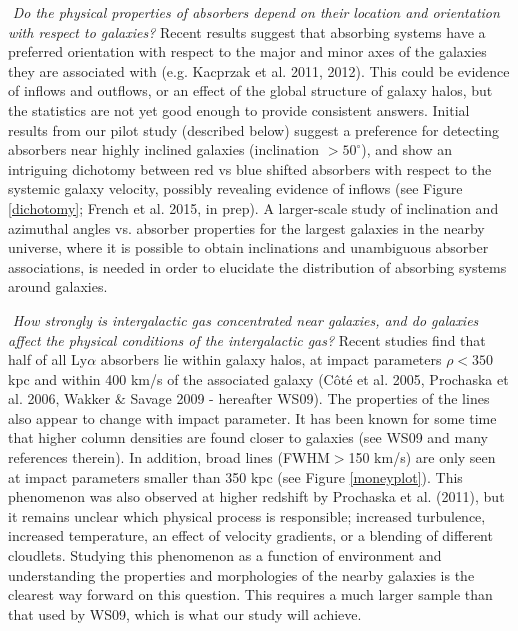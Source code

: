 \documentclass[iop]{emulateapj-rtx4}
\begin{document}
\indent \textbullet $ $ \textit{Do the physical properties of absorbers depend on their location and orientation with respect to galaxies?} Recent results suggest that absorbing systems have a preferred orientation with respect to the major and minor axes of the galaxies they are associated with (e.g. Kacprzak et al. 2011, 2012). This could be evidence of inflows and outflows, or an effect of the global structure of galaxy halos, but the statistics are not yet good enough to provide consistent answers. Initial results from our pilot study (described below) suggest a preference for detecting absorbers near highly inclined galaxies (inclination $>50^{\circ}$), and show an intriguing dichotomy between red vs blue shifted absorbers with respect to the systemic galaxy velocity, possibly revealing evidence of inflows (see Figure \ref{dichotomy}; French et al. 2015, in prep). A larger-scale study of inclination and azimuthal angles vs. absorber properties for the largest galaxies in the nearby universe, where it is possible to obtain inclinations and unambiguous absorber associations, is needed in order to elucidate the distribution of absorbing systems around galaxies.

\vspace{10pt}
\indent \textbullet $ $ \textit{How strongly is intergalactic gas concentrated near galaxies, and do galaxies affect the physical conditions of the intergalactic gas?} Recent studies find that half of all Ly$\alpha$ absorbers lie within galaxy halos, at impact parameters $\rho<350$kpc and within 400 km/s of the associated galaxy (C\^{o}t\'{e} et al. 2005, Prochaska et al. 2006, Wakker $\&$ Savage 2009 - hereafter WS09). The properties of the lines also appear to change with impact parameter. It has been known for some time that higher column densities are found closer to galaxies (see WS09 and many references therein). In addition, broad lines (FWHM$>$150 km/s) are only seen at impact parameters smaller than 350 kpc (see Figure \ref{moneyplot}).  This phenomenon was also observed at higher redshift by Prochaska et al. (2011), but it remains unclear which physical process is responsible; increased turbulence, increased temperature, an effect of velocity gradients, or a blending of different cloudlets. Studying this phenomenon as a function of environment and understanding the properties and morphologies of the nearby galaxies is the clearest way forward on this question. This requires a much larger sample than that used by WS09, which is what our study will achieve. 
\end{document}
